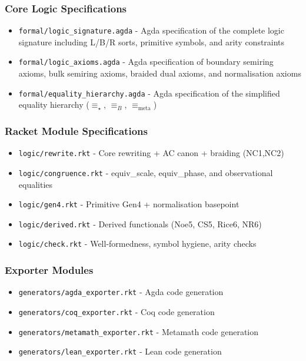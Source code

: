 \subsubsection{Core Logic Specifications}
\begin{itemize}
\item \texttt{formal/logic\_signature.agda} - Agda specification of the complete logic signature including L/B/R sorts, primitive symbols, and arity constraints
\item \texttt{formal/logic\_axioms.agda} - Agda specification of boundary semiring axioms, bulk semiring axioms, braided dual axioms, and normalisation axioms
\item \texttt{formal/equality\_hierarchy.agda} - Agda specification of the simplified equality hierarchy ($\equiv_\star$, $\equiv_B$, $\equiv_{\text{meta}}$)
\end{itemize}

\subsubsection{Racket Module Specifications}
\begin{itemize}
\item \texttt{logic/rewrite.rkt} - Core rewriting + AC canon + braiding (NC1,NC2)
\item \texttt{logic/congruence.rkt} - equiv\_scale, equiv\_phase, and observational equalities
\item \texttt{logic/gen4.rkt} - Primitive Gen4 + normalisation basepoint
\item \texttt{logic/derived.rkt} - Derived functionals (Noe5, CS5, Rice6, NR6)
\item \texttt{logic/check.rkt} - Well-formedness, symbol hygiene, arity checks
\end{itemize}

\subsubsection{Exporter Modules}
\begin{itemize}
\item \texttt{generators/agda\_exporter.rkt} - Agda code generation
\item \texttt{generators/coq\_exporter.rkt} - Coq code generation
\item \texttt{generators/metamath\_exporter.rkt} - Metamath code generation
\item \texttt{generators/lean\_exporter.rkt} - Lean code generation
\end{itemize}

